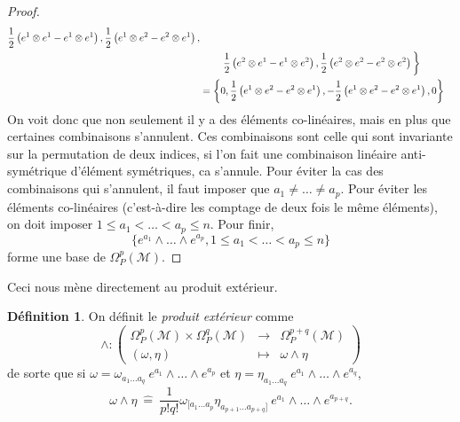 \documentclass[a4paper,11pt]{report}
\theoremstyle{definition}
\theoremstyle{plain}
\theoremstyle{definition}
\newtheorem{defn}{Définition}[chapter]
\theoremstyle{remark}
\newcommand{\M}{\mathscr{M}}
\begin{document}
\begin{proof}
\begin{align}
                    \frac{1}{2}\left( e^1\otimes e^1 - e^1\otimes e^1 \right), \frac{1}{2}\left( e^1\otimes e^2 - e^2\otimes e^1 \right),\\
                    &\hspace{0.825cm}\frac{1}{2}\left( e^2\otimes e^1 - e^1\otimes e^2 \right),\frac{1}{2}\left( e^2\otimes e^2 - e^2\otimes e^2 \right) \bigg\} \\
                    &= \left\{ 
                    0, \frac{1}{2}\left( e^1\otimes e^2 - e^2\otimes e^1 \right),-\frac{1}{2}\left( e^1\otimes e^2 - e^2\otimes e^1 \right),0 \right\}
                \end{align}
                On voit donc que non seulement il y a des éléments co-linéaires, mais en plus que certaines combinaisons s'annulent. Ces combinaisons sont celle qui sont invariante sur la permutation de deux indices, si l'on fait une combinaison linéaire anti-symétrique d'élément symétriques, ca s'annule. Pour éviter la cas des combinaisons qui s'annulent, il faut imposer que $a_1\neq \dots\neq a_p$. Pour éviter les éléments co-linéaires (c'est-à-dire les comptage de deux fois le même éléments), on doit imposer $1\leq a_1<\dots<a_p\leq n$. Pour finir,
                \begin{equation}
                    \{e^{a_1}\wedge\dots \wedge e^{a_p},1\leq a_1<\dots<a_p\leq n\}
                \end{equation}
                forme une base de $\Omega_P^p(\M)$.
            \end{proof}
            
            Ceci nous mène directement au produit extérieur.
            
            \begin{defn}
                On définit le \textit{produit extérieur} comme
                \begin{equation}
                \wedge:\left(
                \begin{array}{ccc}
                    \Omega_P^p(\M)\times \Omega_P^q(\M) & \longrightarrow & \Omega_P^{p+q}(\M) \\
                    (\omega,\eta) & \longmapsto & \omega\wedge\eta
                \end{array}
                \right)
                \end{equation}
                de sorte que si $\omega = \omega_{a_1\dots a_q}~e^{a_1}\wedge \dots\wedge e^{a_{p}}$ et $\eta = \eta_{a_1\dots a_q}~e^{a_1}\wedge \dots\wedge e^{a_{q}}$,
                \begin{equation}
                    \omega\wedge\eta ~\hat{=}~ \frac{1}{p!q!}\omega_{[a_1\dots a_p}\eta_{a_{p+1}\dots a_{p+q}]}~e^{a_1}\wedge \dots\wedge e^{a_{p+q}}.
                \end{equation}
            \end{defn}
            
\end{document}
